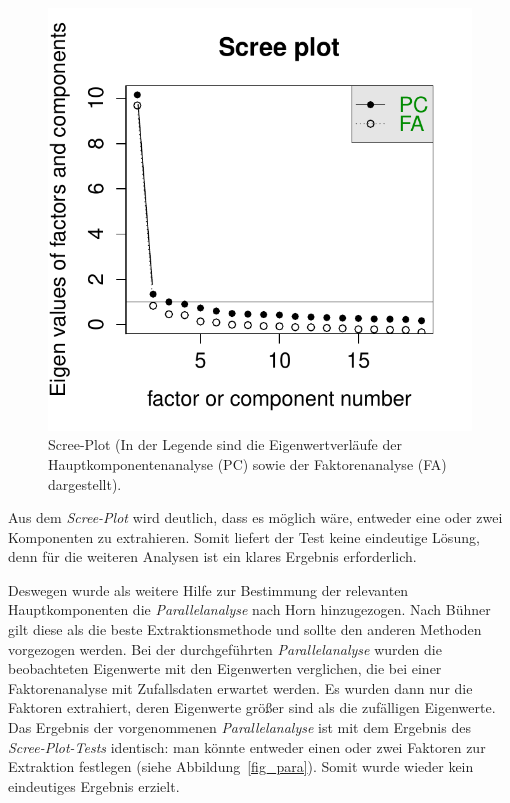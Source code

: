 \documentclass[12pt,a4paper]{article}
\begin{document}
\begin{figure}[h]
\centering
\includegraphics[scale=1]{../R-Berechnungen/Rplot.pdf}
\caption{Scree-Plot (In der Legende sind die Eigenwertverläufe der Hauptkomponentenanalyse (PC) sowie der Faktorenanalyse (FA) dargestellt).}
\label{fig_scree}
\end{figure}
									
Aus dem \textit{Scree-Plot} wird deutlich, dass es möglich wäre, entweder eine oder zwei Komponenten zu extrahieren. Somit liefert der Test keine eindeutige Lösung, denn für die weiteren Analysen ist ein klares Ergebnis erforderlich.

	Deswegen wurde als weitere Hilfe zur Bestimmung der relevanten Hauptkomponenten die \textit{Parallelanalyse} nach Horn hinzugezogen. Nach Bühner gilt diese als die beste Extraktionsmethode und sollte den anderen Methoden vorgezogen werden. Bei der durchgeführten \textit{Parallelanalyse} wurden die beobachteten Eigenwerte mit den Eigenwerten verglichen, die bei einer Faktorenanalyse mit Zufallsdaten erwartet werden. Es wurden dann nur die Faktoren extrahiert, deren Eigenwerte größer sind als die zufälligen Eigenwerte. Das Ergebnis der vorgenommenen \textit{Parallelanalyse} ist mit dem Ergebnis des \textit{Scree-Plot-Tests} identisch: man könnte entweder einen oder zwei Faktoren zur Extraktion festlegen (siehe Abbildung~\ref{fig_para}). Somit wurde wieder kein eindeutiges Ergebnis erzielt.
\end{document}
